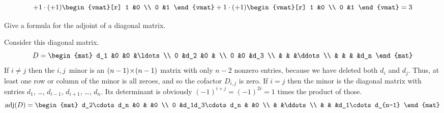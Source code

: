 \begin{exercises}
\begin{answer}
\begin{equation*}
       +1\cdot (+1)\begin{vmat}[r]
               1  &0  \\
               0  &1
             \end{vmat}
       +1\cdot (+1)\begin{vmat}[r]
               1  &0  \\
               0  &1
             \end{vmat}=3
      \end{equation*}  
    \end{answer}
  \item 
    Give a formula for the adjoint of a diagonal matrix.
    \begin{answer}
      Consider this diagonal matrix.
      \begin{equation*}
        D=
        \begin{mat}
          d_1  &0   &0   &\ldots    \\
          0    &d_2 &0   &          \\
          0    &0   &d_3            \\
               &    &    &\ddots    \\
               &    &    &      &d_n   
        \end{mat}
      \end{equation*}
      If $i\neq j$ then the $i,j$~minor is an $(n-1) \! \times \! (n-1)$ matrix
      with only $n-2$ nonzero entries, because we have deleted
      both $d_i$ and $d_j$.
      Thus, at least one row or column of the minor is all zeroes, and
      so the cofactor $D_{i,j}$ is zero.
      If $i=j$ then the minor is the diagonal matrix with entries
      $d_1$, \ldots, $d_{i-1}$, $d_{i+1}$, \ldots, $d_n$.
      Its determinant is obviously $(-1)^{i+j}=(-1)^{2i}=1$ 
      times the product of those.
      \begin{equation*}
        \adj(D)
        =
        \begin{mat}
          d_2\cdots d_n    &0                 &      &0    \\
          0                &d_1d_3\cdots d_n  &      &0    \\
                           &                  &\ddots      \\
                           &                  &       &d_1\cdots d_{n-1} 
        \end{mat}
      \end{equation*}


\end{answer}
\end{exercises}
